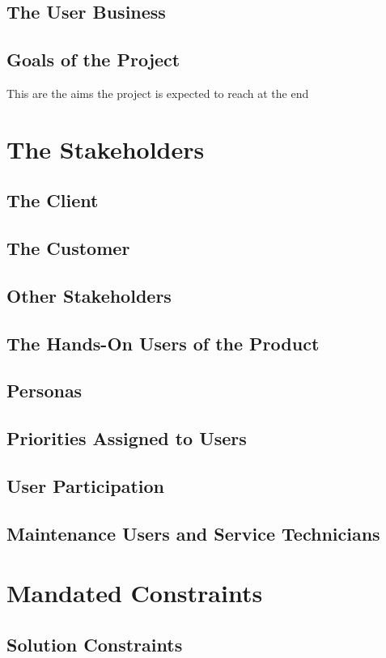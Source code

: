 \documentclass[12pt,a4paper]{article}
\begin{document}
\subsection{The User Business}
\paragraph{}
\subsection{Goals of the Project}
This are the aims the project is expected to reach at the end
\pagebreak
\section{The Stakeholders}
\subsection{The Client}
\subsection{The Customer}
\subsection{Other Stakeholders}
\subsection{The Hands-On Users of the Product}
\subsection{Personas}
\subsection{Priorities Assigned to Users}
\subsection{User Participation}
\subsection{Maintenance Users and Service Technicians}
\pagebreak
\section{Mandated Constraints}
\subsection{Solution Constraints}
\end{document}
